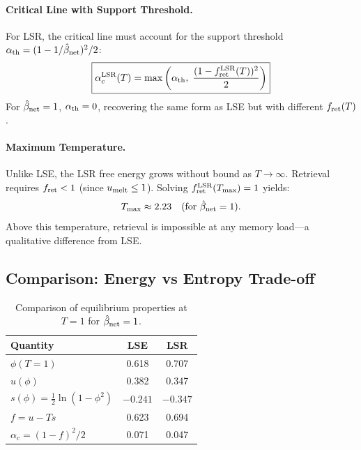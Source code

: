 \documentclass{article}
\theoremstyle{plain}
\theoremstyle{definition}
\theoremstyle{remark}
\begin{document}
\paragraph{Critical Line with Support Threshold.} For LSR, the critical line must account for the support threshold $\alpha_{\rm th} = (1 - 1/\hat{\beta}_{\rm net})^2/2$:
\begin{equation}
    \boxed{\alpha_c^{\rm LSR}(T) = \max\left(\alpha_{\rm th},\; \frac{(1 - f_{\rm ret}^{\rm LSR}(T))^2}{2}\right)}
    \label{eq:alpha_lsr}
\end{equation}
For $\hat{\beta}_{\rm net} = 1$, $\alpha_{\rm th} = 0$, recovering the same form as LSE but with different $f_{\rm ret}(T)$.

\paragraph{Maximum Temperature.} Unlike LSE, the LSR free energy grows without bound as $T \to \infty$. Retrieval requires $f_{\rm ret} < 1$ (since $u_{\rm melt} \le 1$). Solving $f_{\rm ret}^{\rm LSR}(T_{\max}) = 1$ yields:
\begin{equation}
    T_{\max} \approx 2.23 \quad (\text{for } \hat{\beta}_{\rm net} = 1).
\end{equation}
Above this temperature, retrieval is impossible at any memory load---a qualitative difference from LSE.

\subsection{Comparison: Energy vs Entropy Trade-off}

\begin{table}[t]
\caption{Comparison of equilibrium properties at $T = 1$ for $\hat{\beta}_{\rm net} = 1$.}
\label{tab:comparison}
\vskip 0.1in
\begin{center}
\begin{small}
\begin{tabular}{lcc}
\toprule
Quantity & LSE & LSR \\
\midrule
$\phi(T=1)$ & 0.618 & 0.707 \\
$u(\phi)$ & 0.382 & 0.347 \\
$s(\phi) = \frac{1}{2}\ln(1-\phi^2)$ & $-0.241$ & $-0.347$ \\
$f = u - Ts$ & 0.623 & 0.694 \\
$\alpha_c = (1-f)^2/2$ & 0.071 & 0.047 \\
\bottomrule
\end{tabular}
\end{small}
\end{center}
\end{table}
\end{document}
